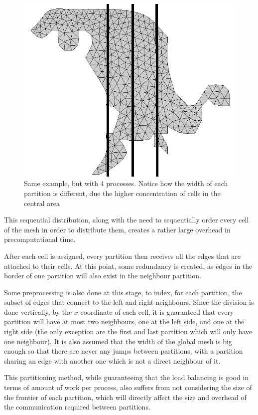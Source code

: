 \begin{figure}[!htp]
	\begin{center}
		\includegraphics[width=\columnwidth]{report.may/images/foz_p4_msh}
	\end{center}
	\caption{Same example, but with 4 processes. Notice how the width of each partition is different, due the higher concentration of cells in the central area}
	\label{fig:tasktimeAOS}
\end{figure}

This sequential distribution, along with the need to sequentially order every cell of the mesh in order to distribute them, creates a rather large overhead in precomputational time.

After each cell is assigned, every partition then receives all the edges that are attached to their cells. At this point, some redundancy is created, as edges in the border of one partition will also exist in the neighbour partition.

Some preprocessing is also done at this stage, to index, for each partition, the subset of edges that connect to the left and right neighbours. Since the division is done vertically, by the $x$ coordinate of each cell, it is guaranteed that every partition will have at most two neighbours, one at the left side, and one at the right side (the only exception are the first and last partition which will only have one neighbour). It is also assumed that the width of the global mesh is big enough so that there are never any jumps between partitions, with a partition sharing an edge with another one which is not a direct neighbour of it.

This partitioning method, while guaranteeing that the load balancing is good in terms of amount of work per process, also suffers from not considering the size of the frontier of each partition, which will directly affect the size and overhead of the communication required between partitions.